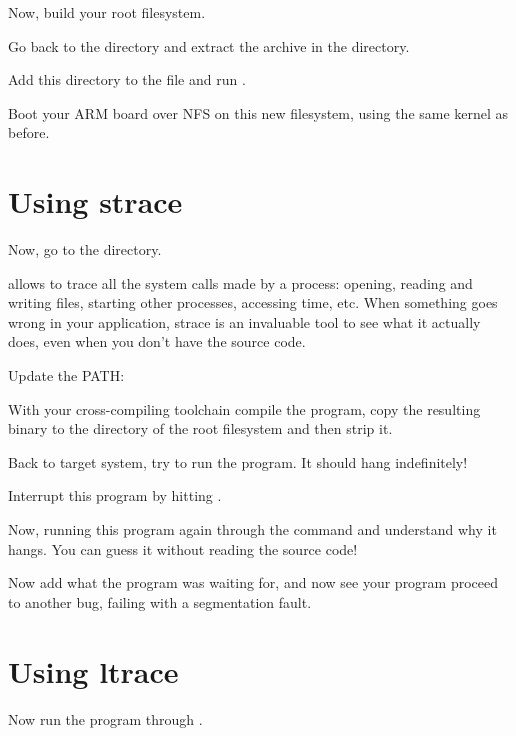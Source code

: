 Now, build your root filesystem.

Go back to the  directory
and extract the 
archive in the  directory.

Add this directory to the  file and run
.

Boot your ARM board over NFS on this new filesystem, using the same
kernel as before.

\section{Using strace}

Now, go to the  directory.

 allows to trace all the system calls made by a process:
opening, reading and writing files, starting other processes,
accessing time, etc. When something goes wrong in your application,
strace is an invaluable tool to see what it actually does, even when
you don't have the source code.


Update the PATH:
{}
\normalsize

With your cross-compiling toolchain compile the 
program, copy the resulting binary to the  directory of the root
filesystem and then strip it.

Back to target system, try to run the 
program. It should hang indefinitely!

Interrupt this program by hitting \code{[Ctrl] [C]}.

Now, running this program again through the  command and
understand why it hangs. You can guess it without reading the source
code!

Now add what the program was waiting for, and now see your program
proceed to another bug, failing with a segmentation fault.

\section{Using ltrace}

Now run the program through .

